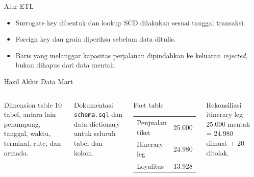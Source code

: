 \documentclass[xcolor=table,t,aspectratio=169]{beamer}
\begin{document}
\begin{frame}{Alur ETL}
\footnotesize
\centering
{}

\vspace{0.6cm}
\begin{itemize}
    \item Surrogate key dibentuk dan lookup SCD dilakukan sesuai tanggal transaksi.
    \item Foreign key dan grain diperiksa sebelum data ditulis.
    \item Baris yang melanggar kapasitas perjalanan dipindahkan ke keluaran
    \textit{rejected}, bukan dihapus dari data mentah.
\end{itemize}
\end{frame}

\begin{frame}{Hasil Akhir Data Mart}
\footnotesize
\begin{columns}[T]
\begin{block}{Dimension table}
10 tabel, antara lain penumpang, tanggal, waktu, terminal, rute, dan armada.
\end{block}
\begin{block}{Dokumentasi}
\texttt{schema.sql} dan data dictionary untuk seluruh tabel dan kolom.
\end{block}
\begin{block}{Fact table}
\begin{tabular}{lr}
Penjualan tiket & 25.000 \\
Itinerary leg & 24.980 \\
Loyalitas & 13.928 \\
\end{tabular}
\end{block}
\begin{block}{Rekonsiliasi itinerary leg}
25.000 mentah = 24.980 dimuat + 20 ditolak.
\end{block}
\end{columns}
\end{frame}
\end{document}
